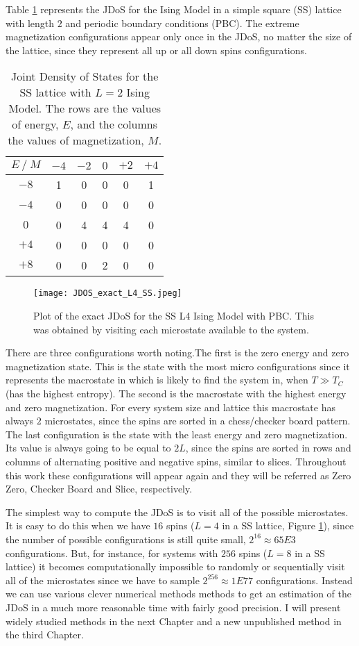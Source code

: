 Table \ref{exact_L2} represents the JDoS for the Ising Model in a simple square (SS) lattice with length $2$ and periodic boundary conditions (PBC). The extreme magnetization configurations appear only once in the JDoS, no matter the size of the lattice, since they represent all up or all down spins configurations. 

\begin{table}[h]
\centering
\caption{Joint Density of States for the SS lattice with $L=2$ Ising Model. The rows are the values of energy, $E$, and the columns the values of magnetization, $M$.}
\label{exact_L2}
\begin{tabular}{c|ccccc}
$E \ / \ M$ & $-4$ & $-2$ &  $0$ & $+2$ &  $+4$ \\ \hline
$-8$  & 1  & 0  & 0 & 0 & 1 \\
$-4$  & 0  & 0  & 0 & 0 & 0 \\
$0$   & 0  & 4  & 4 & 4 & 0 \\
$+4$   & 0  & 0  & 0 & 0 & 0 \\
$+8$   & 0  & 0  & 2 & 0 & 0
\end{tabular}
\end{table}

\begin{figure}[h]
	\centering
	\texttt{[image: JDOS\_exact\_L4\_SS.jpeg]}
	\caption{Plot of the exact JDoS for the SS L4 Ising Model with PBC. This was obtained by visiting each microstate available to the system.}
	\label{exact_L4}
\end{figure}

\pagebreak

There are three configurations worth noting.The first is the zero energy and zero magnetization state. This is the state with the most micro configurations since it represents the macrostate in which is likely to find the system in, when $T\gg T_C$ (has the highest entropy). The second is the macrostate with the highest energy and zero magnetization. For every system size and lattice this macrostate has always $2$ microstates, since the spins are sorted in a chess/checker board pattern. The last configuration is the state with the least energy and zero magnetization. Its value is always going to be equal to $2L$, since the spins are sorted in rows and columns of alternating positive and negative spins, similar to slices. Throughout this work these configurations will appear again and they will be referred as Zero Zero, Checker Board and Slice, respectively. 

The simplest way to compute the JDoS is to visit all of the possible microstates. It is easy to do this when we have $16$ spins ($L=4$ in a SS lattice, Figure \ref{exact_L4}), since the number of possible configurations is still quite small, $2^{16} \approx 65E3$ configurations. But, for instance, for systems with $256$ spins ($L=8$ in a SS lattice) it becomes computationally impossible to randomly or sequentially visit all of the microstates since we have to sample $2^{256} \approx	 1E77$ configurations. 
Instead we can use various clever numerical methods methods to get an estimation of the JDoS in a much more reasonable time with fairly good precision. I will present widely studied methods in the next Chapter and a new unpublished method in the third Chapter.

